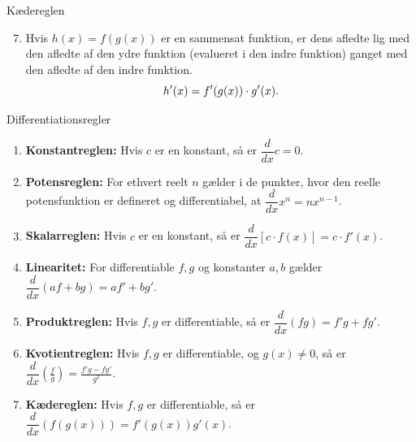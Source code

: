 \begin{theorem}{Kædereglen}
    \vspace{0.5em}
    \begin{enumerate}
    \setcounter{enumi}{6}
        \item Hvis \( h(x) = f(g(x)) \) er en sammensat funktion, er dens afledte lig med den afledte af den ydre funktion (evalueret i den indre funktion) ganget med den afledte af den indre funktion. \vspace{0.5em}
        \[
        h'(x) = f'(g(x)) \cdot g'(x). \vspace{0.5em}
        \]
    \end{enumerate}
\end{theorem}

\begin{theorem}{Differentiationsregler}

    \begin{enumerate}
        \item \textbf{Konstantreglen:} Hvis $c$ er en konstant, så er $\dfrac{d}{dx}c=0$. \vspace{0.5em}
        \item \textbf{Potensreglen:} For ethvert reelt $n$ gælder i de punkter, hvor den reelle potensfunktion er defineret og differentiabel, at $\dfrac{d}{dx}x^n = n x^{n-1}$. \vspace{0.5em}
        \item \textbf{Skalarreglen:} Hvis $c$ er en konstant, så er $\dfrac{d}{dx}[c \cdot f(x)] = c \cdot f'(x)$. \vspace{0.5em}
        \item \textbf{Linearitet:} For differentiable $f,g$ og konstanter $a,b$ gælder $\dfrac{d}{dx}(a f + b g) = a f' + b g'$. \vspace{0.5em}
        \item \textbf{Produktreglen:} Hvis $f,g$ er differentiable, så er $\dfrac{d}{dx}(f g) = f'g + fg'$. \vspace{0.5em}
        \item \textbf{Kvotientreglen:} Hvis $f,g$ er differentiable, og $g(x)\neq0$, så er $\dfrac{d}{dx}\left(\frac{f}{g}\right) = \frac{f'g - fg'}{g^2}$. \vspace{0.5em}
        \item \textbf{Kædereglen:} Hvis $f,g$ er differentiable, så er $\dfrac{d}{dx}(f(g(x))) = f'(g(x))g'(x)$. \vspace{0.5em}
    \end{enumerate}

\end{theorem}

